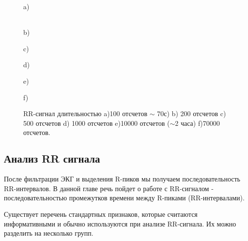 \begin{figure}[h!]
	\begin{minipage}[h]{0.47\linewidth}
		\center{\texttt{[image: rr\_100]}} a) \\
	\end{minipage}
	\hfill
	\begin{minipage}[h]{0.47\linewidth}
		\center{\texttt{[image: rr\_200]}} \\b)
	\end{minipage}
	\vfill
	\begin{minipage}[h]{0.47\linewidth}
		\center{\texttt{[image: rr\_500]}} c) \\
	\end{minipage}
	\hfill
	\begin{minipage}[h]{0.47\linewidth}
		\center{\texttt{[image: rr\_1000]}} d) \\
	\end{minipage}
	\begin{minipage}[h]{0.47\linewidth}
		\center{\texttt{[image: rr\_10000]}} e) \\
	\end{minipage}
	\hfill
	\begin{minipage}[h]{0.47\linewidth}
		\center{\texttt{[image: rr\_70000]}} f) \\
	\end{minipage}
	\caption{RR-сигнал длительностью a)100 отсчетов $\sim$ 70с) b) 200 отсчетов
		c) 500 отсчетов d) 1000 отсчетов e)10000 отсчетов ($\sim $2 часа) f)70000 отсчетов.}
	\label{ris:real_RR}
\end{figure}


\subsection{Анализ RR сигнала}
После фильтрации ЭКГ и выделения R-пиков мы получаем последовательность RR-интервалов. В данной главе речь пойдет о работе с RR-сигналом - последовательностью промежутков времени между R-пиками (RR-интервалами).

Существует перечень стандартных признаков, которые считаются информативными и обычно используются при анализе RR-сигнала.
Их можно разделить на несколько групп.

